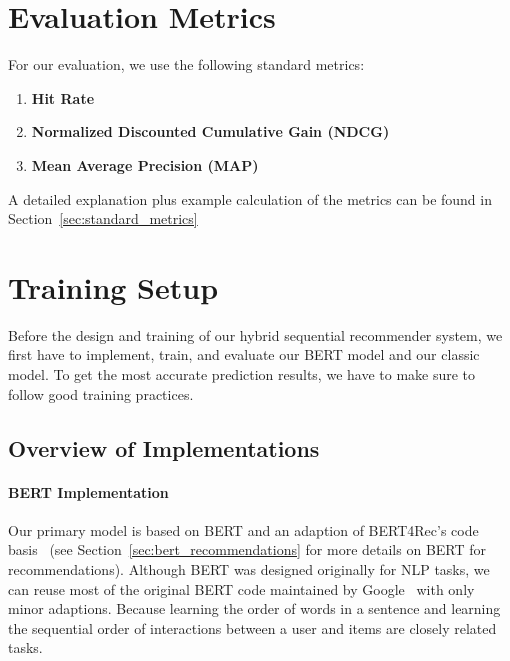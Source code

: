 \section{Evaluation Metrics}\label{sec:metrics}
For our evaluation, we use the following standard metrics:

\begin{enumerate}
    \item \textbf{Hit Rate}
    
    \item \textbf{Normalized Discounted Cumulative Gain (NDCG)}
    
    \item \textbf{Mean Average Precision (MAP)} 
\end{enumerate}

A detailed explanation plus example calculation of the metrics can be found in Section~\ref{sec:standard_metrics}

% 



\section{Training Setup}
\label{sec:training_setup}
Before the design and training of our hybrid sequential recommender system, we first have to implement, train, and evaluate our BERT model and our classic model. To get the most accurate prediction results, we have to make sure to follow good training practices.

\subsection{Overview of Implementations}

\paragraph{BERT Implementation}
Our primary model is based on BERT and an adaption of BERT4Rec's code basis~\cite{Githubbert4rec} (see Section~\ref{sec:bert_recommendations} for more details on BERT for recommendations). Although BERT was designed originally for NLP tasks, we can reuse most of the original BERT code maintained by Google~\cite{Githubbert} with only minor adaptions. Because learning the order of words in a sentence and learning the sequential order of interactions between a user and items are closely related tasks.  


